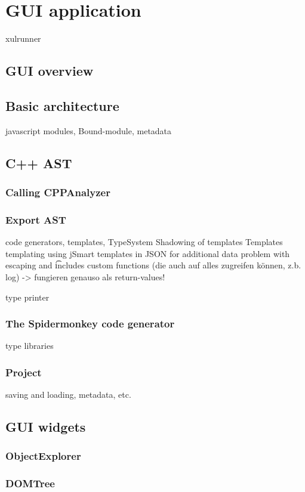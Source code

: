\chapter{GUI application}
\label{chap:GUIApplication}

xulrunner

\section{GUI overview}

\section{Basic architecture}

javascript modules, Bound-module, metadata

\section{C++ AST}
\subsection{Calling CPPAnalyzer}


\subsection{Export AST}

code generators, templates, 
    TypeSystem
        Shadowing of templates
    Templates
        templating using jSmart
        templates in JSON for additional data
        problem with escaping \n and \t
        includes
        custom functions (die auch auf alles zugreifen können, z.b. log) -> fungieren genauso als return-values!

type printer
\subsection{The Spidermonkey code generator}

type libraries

\subsection{Project}

saving and loading, metadata, etc.

\section{GUI widgets}

\subsection{ObjectExplorer}

\subsection{DOMTree}


